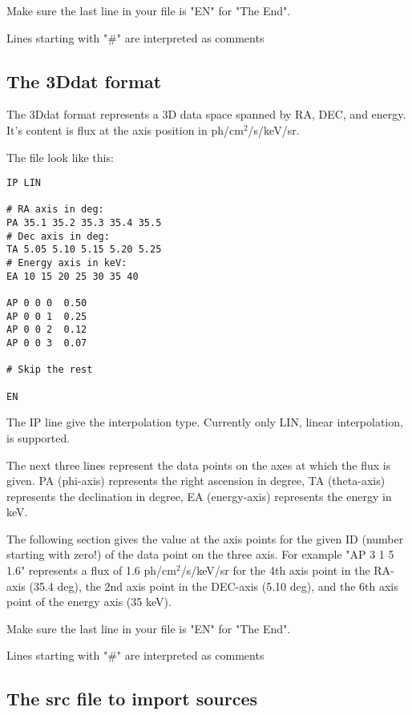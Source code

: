 Make sure the last line in your file is "EN" for "The End".

Lines starting with "\#" are interpreted as comments

\subsection{The 3Ddat format \label{input:3Ddat}}

The 3Ddat format represents a 3D data space spanned by RA, DEC, and energy. It's content is flux at the axis position in ph/cm$^2$/s/keV/sr.

The file look like this:

\begin{verbatim}
IP LIN

# RA axis in deg:
PA 35.1 35.2 35.3 35.4 35.5
# Dec axis in deg:
TA 5.05 5.10 5.15 5.20 5.25
# Energy axis in keV:
EA 10 15 20 25 30 35 40

AP 0 0 0  0.50
AP 0 0 1  0.25
AP 0 0 2  0.12
AP 0 0 3  0.07

# Skip the rest

EN
\end{verbatim}

The IP line give the interpolation type. Currently only LIN, linear interpolation, is supported.

The next three lines represent the data points on the axes at which the flux is given. PA (phi-axis) represents the right ascension in degree, TA (theta-axis) represents the declination in degree, EA (energy-axis) represents the energy in keV.

The following section gives the value at the axis points for the given ID (number starting with zero!) of the data point on the three axis.
For example "AP 3 1 5 1.6" represents a flux of 1.6 ph/cm$^2$/s/keV/sr for the 4th axis point in the RA-axis (35.4 deg), the 2nd axis point in the DEC-axis (5.10 deg), and the 6th axis point of the energy axis (35 keV).

Make sure the last line in your file is "EN" for "The End".

Lines starting with "\#" are interpreted as comments


\subsection{The src file to import sources}

